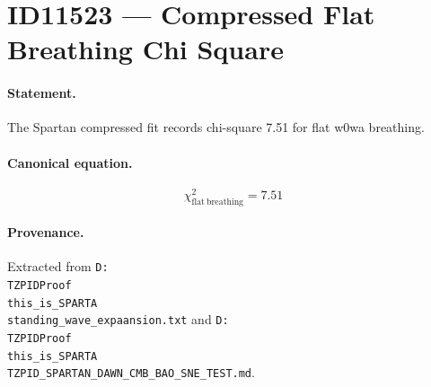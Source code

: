 \section*{ID11523 --- Compressed Flat Breathing Chi Square}

\paragraph{Statement.}
The Spartan compressed fit records chi-square 7.51 for flat w0wa breathing.

\paragraph{Canonical equation.}
\[
\chi^2_{\mathrm{flat\ breathing}}=7.51
\]

\paragraph{Provenance.}
Extracted from \texttt{D:\\TZPIDProof\\this\_is\_SPARTA\\standing\_wave\_expaansion.txt} and \texttt{D:\\TZPIDProof\\this\_is\_SPARTA\\TZPID\_SPARTAN\_DAWN\_CMB\_BAO\_SNE\_TEST.md}.
